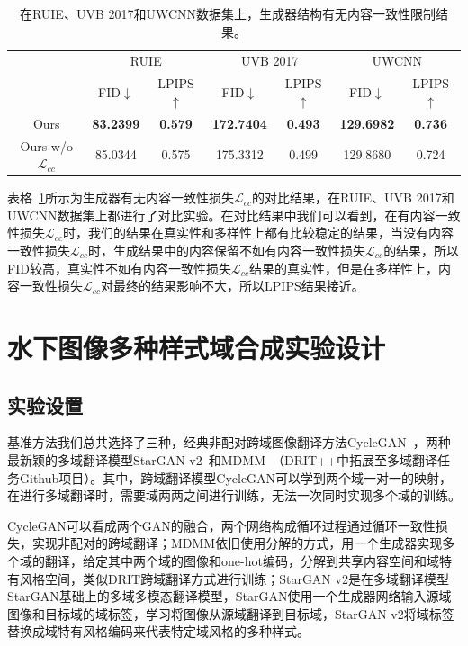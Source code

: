 \begin{table}[htbp]
  \centering
  \caption{在RUIE、UVB 2017和UWCNN数据集上，生成器结构有无内容一致性限制结果。}
    \begin{tabular}{c|c|c|c|c|c|c}
    \hline
    \multirow{2}[3]{*}{} & \multicolumn{2}{c|}{RUIE} & \multicolumn{2}{c|}{UVB 2017} & \multicolumn{2}{c}{UWCNN} \\
\cmidrule{2-7}          & \multicolumn{1}{c|}{FID$\downarrow$ } & \multicolumn{1}{c|}{LPIPS$\uparrow$} & \multicolumn{1}{c|}{FID$\downarrow$ } & \multicolumn{1}{c|}{LPIPS$\uparrow$} & \multicolumn{1}{c|}{FID$\downarrow$ } & LPIPS$\uparrow$ \\
    \midrule
    Ours  & \textbf{83.2399} & \textbf{0.579} & \textbf{172.7404} & \textbf{0.493} & \textbf{129.6982} & \textbf{0.736} \\
    Ours w/o $\mathcal{L}_{cc}$ & 85.0344 & 0.575 & 175.3312 & 0.499 & 129.8680 & 0.724 \\
    \hline
    \end{tabular}%
  \label{tab:ablation_modal_lcc}%
\end{table}%

表格~\ref{tab:ablation_modal_lcc}所示为生成器有无内容一致性损失$\mathcal{L}_{cc}$的对比结果，在RUIE、UVB 2017和UWCNN数据集上都进行了对比实验。在对比结果中我们可以看到，在有内容一致性损失$\mathcal{L}_{cc}$时，我们的结果在真实性和多样性上都有比较稳定的结果，当没有内容一致性损失$\mathcal{L}_{cc}$时，生成结果中的内容保留不如有内容一致性损失$\mathcal{L}_{cc}$的结果，所以FID较高，真实性不如有内容一致性损失$\mathcal{L}_{cc}$结果的真实性，但是在多样性上，内容一致性损失$\mathcal{L}_{cc}$对最终的结果影响不大，所以LPIPS结果接近。

\section{水下图像多种样式域合成实验设计}
\subsection{实验设置}
基准方法我们总共选择了三种，经典非配对跨域图像翻译方法CycleGAN~\cite{zhu2017unpaired}，两种最新颖的多域翻译模型StarGAN v2~\cite{choi2020stargan}和MDMM~\cite{lee2020drit++}（DRIT++中拓展至多域翻译任务Github项目）。其中，跨域翻译模型CycleGAN可以学到两个域一对一的映射，在进行多域翻译时，需要域两两之间进行训练，无法一次同时实现多个域的训练。

CycleGAN可以看成两个GAN的融合，两个网络构成循环过程通过循环一致性损失，实现非配对的跨域翻译；MDMM依旧使用分解的方式，用一个生成器实现多个域的翻译，给定其中两个域的图像和one-hot编码，分解到共享内容空间和域特有风格空间，类似DRIT跨域翻译方式进行训练；StarGAN v2是在多域翻译模型StarGAN基础上的多域多模态翻译模型，StarGAN使用一个生成器网络输入源域图像和目标域的域标签，学习将图像从源域翻译到目标域，StarGAN v2将域标签替换成域特有风格编码来代表特定域风格的多种样式。

